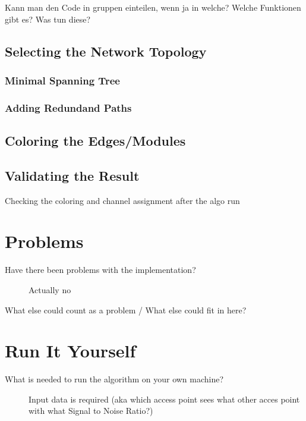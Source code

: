   Kann man den Code in gruppen einteilen, wenn ja in welche? Welche Funktionen gibt es? Was tun diese?
  \subsection{Selecting the Network Topology}
    \subsubsection{Minimal Spanning Tree}
    \subsubsection{Adding Redundand Paths}
  \subsection{Coloring the Edges/Modules}
  \subsection{Validating the Result}
    Checking the coloring and channel assignment after the algo run
\section{Problems}
  \begin{description}
   \item[Have there been problems with the implementation?]
   Actually no
   \item[What else could count as a problem / What else could fit in here?]
  \end{description}
\section{Run It Yourself}
  \begin{description}
   \item[What is needed to run the algorithm on your own machine?]
    Input data is required (aka which access point sees what other acces point with what Signal to Noise Ratio?) \newline
  \end{description}
